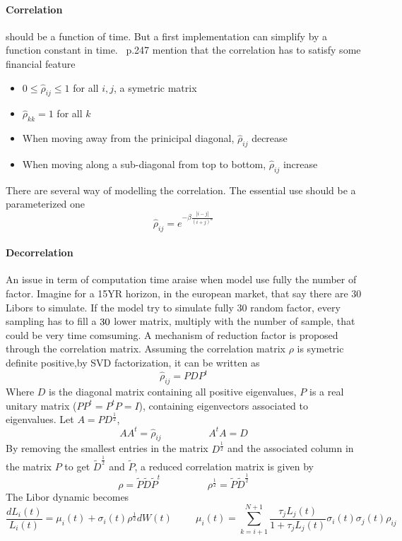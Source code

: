\documentclass[a4paper,10pt]{article}
\newcommand{\Lit}{L_{i}(t)}
\newcommand{\muit}{\mu_i(t)}
\newcommand{\sigmait}{\sigma_i(t)}
\newcommand{\Ljt}{L_{j}(t)}
\newcommand{\sigmajt}{\sigma_j(t)}
\newcommand{\rhoij}{\rho_{ij}}
\begin{document}
\paragraph{Correlation} should be a function of time. But a first implementation can simplify by a function constant in time. ~\cite{BRIGO2006}p.247 mention that the correlation has to satisfy some financial feature
\begin{itemize}
\item $0 \leq \hat{\rho}_{ij} \leq 1 $ for all $i,j$, a symetric matrix
\item $\hat{\rho}_{kk} = 1 $ for all $k$ 
\item When moving away from the prinicipal diagonal, $\hat{\rho}_{ij}$ decrease 
\item When moving along a sub-diagonal from top to bottom, $\hat{\rho}_{ij}$ increase 
\end{itemize} 
There are several way of modelling the correlation. The essential use should be a parameterized one
\[
\hat{\rho}_{ij} = e^{- \beta \frac{ |i-j| }{(i+j)^{\alpha}}}
\]
\paragraph{Decorrelation}
An issue in term of computation time araise when model use fully the number of factor. Imagine for a 15YR horizon, in the european market, that say there are 30 Libors to simulate. If the model try to simulate fully 30 random factor, every sampling has to fill a $30\time30$ lower matrix, multiply with the number of sample, that could be very time comsuming. A mechanism of reduction factor is proposed through the correlation matrix. Assuming the correlation matrix $\rho$ is symetric definite positive,by SVD factorization, it can be written as
\[
\hat{\rho}_{ij} = PDP^t
\]
Where $D$ is the diagonal matrix containing all positive eigenvalues, $P$ is a real unitary matrix ($PP^t =P^tP = I $), containing eigenvectors associated to eigenvalues. Let $A=PD^{\frac{1}{2}}$, 
\[
AA^t = \hat{\rho}_{ij}
\hspace{2cm}
A^tA = D
\]
By removing the smallest entries in the matrix $D^{\frac{1}{2}}$ and the associated column in the matrix $P$ to get $\tilde{D}^{\frac{1}{2}}$ and $\tilde{P}$,  a reduced correlation matrix is given by
\[
\rho = \tilde{P}\tilde{D}\tilde{P}^t
\hspace{2cm}
\rho^{\frac{1}{2}} =  \tilde{P}\tilde{D}^{\frac{1}{2}}
\]
The Libor dynamic becomes
\begin{equation}
\label{eq:reduced_libor_dynamic}
\frac{d\Lit}{\Lit} = \muit + \sigmait \rho^{\frac{1}{2} } dW(t)
\hspace{1cm}
\muit = \sum_{k=i+1}^{N+1} \frac{\tau_j \Ljt}{1+\tau_j \Ljt} \sigmait \sigmajt \rhoij
\end{equation}
\end{document}
